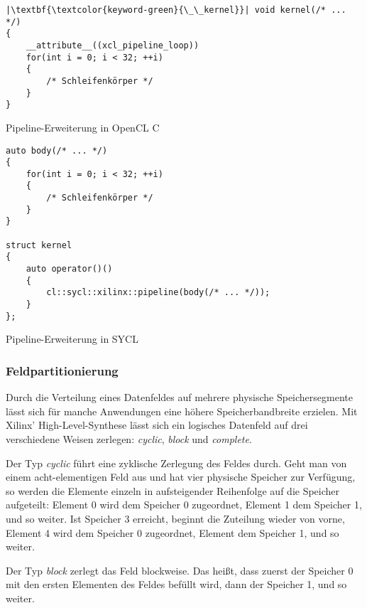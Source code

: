 \begin{code}
    \begin{verbatim}
|\textbf{\textcolor{keyword-green}{\_\_kernel}}| void kernel(/* ... */)
{
    __attribute__((xcl_pipeline_loop))
    for(int i = 0; i < 32; ++i)
    {
        /* Schleifenkörper */
    }
}
    \end{verbatim}
    \caption{Pipeline-Erweiterung in OpenCL C}
    \label{sycl:erweiterungen:xilinx:pipeline:opencl}
\end{code}

\begin{code}
    \begin{verbatim}
auto body(/* ... */)
{
    for(int i = 0; i < 32; ++i)
    {
        /* Schleifenkörper */
    }
}

struct kernel
{
    auto operator()()
    {
        cl::sycl::xilinx::pipeline(body(/* ... */));
    }
};
    \end{verbatim}
    \caption{Pipeline-Erweiterung in SYCL}
    \label{sycl:erweiterungen:xilinx:pipeline:sycl}
\end{code}

\subsubsection{Feldpartitionierung}
\label{sycl:erweiterungen:xilinx:partitioning}

Durch die Verteilung eines Datenfeldes auf mehrere physische Speichersegmente
lässt sich für manche Anwendungen eine höhere Speicherbandbreite erzielen.
Mit Xilinx' High-Level-Synthese lässt sich ein logisches Datenfeld auf drei
verschiedene Weisen zerlegen: \textit{cyclic}, \textit{block} und
\textit{complete}. \cite[vgl.][16]{sdxpragma2019}

Der Typ \textit{cyclic} führt eine zyklische Zerlegung des Feldes durch. Geht
man von einem acht-elementigen Feld aus und hat vier physische Speicher zur
Verfügung, so werden die Elemente einzeln in aufsteigender Reihenfolge auf die
Speicher aufgeteilt: Element 0 wird dem Speicher 0 zugeordnet, Element 1 dem
Speicher 1, und so weiter. Ist Speicher 3 erreicht, beginnt die Zuteilung wieder
von vorne, Element 4 wird dem Speicher 0 zugeordnet, Element dem Speicher 1,
und so weiter. \cite[vgl.][17]{sdxpragma2019}

Der Typ \textit{block} zerlegt das Feld blockweise. Das heißt, dass zuerst der
Speicher 0 mit den ersten Elementen des Feldes befüllt wird, dann der Speicher
1, und so weiter. \cite[vgl.][17]{sdxpragma2019}


